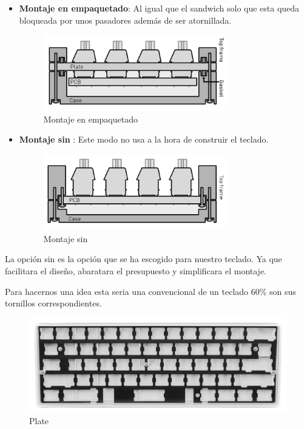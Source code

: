 \begin{itemize}
    \item \textbf{Montaje en empaquetado}: Al igual que el sandwich solo que esta queda bloqueada por unos pasadores además de ser atornillada.
    \begin{figure}[H]
        \centering
        \includegraphics[width=0.75\textwidth]{imagenes/Capitulos/Cap03/Montajes/Montaje6.png}
        \caption{Montaje en empaquetado \cite{Keyboards-Mounting-Styles}}
        \label{fig:Montaje6}
    \end{figure}
    
    \item \textbf{Montaje sin }: Este modo no usa  a la hora de construir el teclado.
    \begin{figure}[H]
        \centering
        \includegraphics[width=0.75\textwidth]{imagenes/Capitulos/Cap03/Montajes/Montaje7.png}
        \caption{Montaje sin  \cite{Keyboards-Mounting-Styles}}
        \label{fig:Montaje7}
    \end{figure}
    
\end{itemize}
\newpage
La opción sin  es la opción que se ha escogido para nuestro teclado. Ya que facilitara el diseño, abaratara el presupuesto y simplificara el montaje.

Para hacernos una idea esta seria una  convencional de un teclado 60\% son sus tornillos correspondientes.

\begin{figure}[H]
    \centering
    \includegraphics[width=1\textwidth]{imagenes/Capitulos/Cap03/Plate.png}
    \caption{Plate \cite{PlateImageSource}}
    \label{fig:Plate}
\end{figure}

